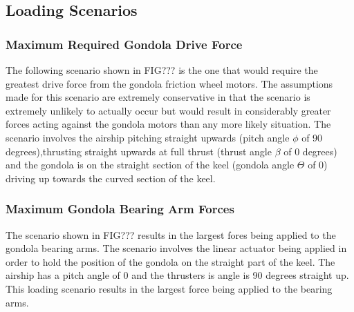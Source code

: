 \documentclass[../main.tex]{subfiles}
\begin{document}
\subsection{Loading Scenarios} \label{loadingScenarios}
\subsubsection*{Maximum Required Gondola Drive Force}
The following scenario shown in FIG??? is the one that would require the greatest drive force from the gondola friction wheel motors. The assumptions made for this scenario are extremely conservative in that the scenario is extremely unlikely to actually occur but would result in considerably greater forces acting against the gondola motors than any more likely situation. The scenario involves the airship pitching straight upwards (pitch angle $\phi$ of 90 degrees),thrusting straight upwards at full thrust (thrust angle $\beta$ of 0 degrees) and the gondola is on the straight section of the keel (gondola angle $\Theta$ of 0) driving up towards the curved section of the keel.

\subsubsection*{Maximum Gondola Bearing Arm Forces}
The scenario shown in FIG??? results in the largest fores being applied to the gondola bearing arms. The scenario involves the linear actuator being applied in order to hold the position of the gondola on the straight part of the keel. The airship has a pitch angle of 0 and the thrusters is  angle is 90 degrees straight up. This loading scenario results in the largest force  being applied to the bearing arms.
\end{document}
